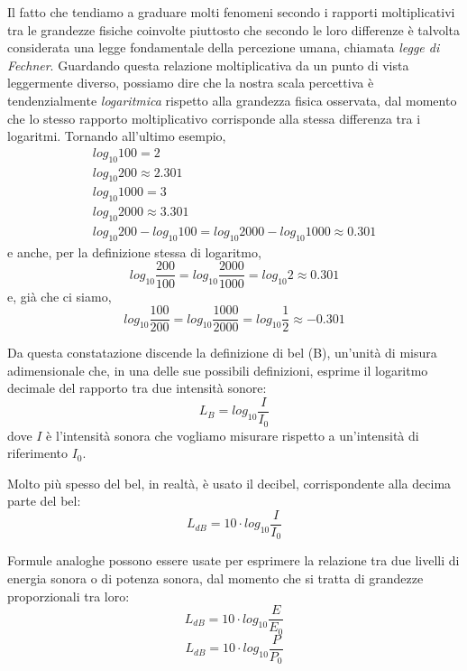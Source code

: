 Il fatto che tendiamo a graduare molti fenomeni secondo i rapporti moltiplicativi tra le grandezze fisiche coinvolte piuttosto che secondo le loro differenze è talvolta considerata una legge fondamentale della percezione umana, chiamata \emph{legge di Fechner}. Guardando questa relazione moltiplicativa da un punto di vista leggermente diverso, possiamo dire che la nostra scala percettiva è tendenzialmente \emph{logaritmica} rispetto alla grandezza fisica osservata, dal momento che lo stesso rapporto moltiplicativo corrisponde alla stessa differenza tra i logaritmi. Tornando all'ultimo esempio,
\begin{equation}
\begin{aligned}
log_{10}100 = 2\\
log_{10}200 \approx 2.301\\
log_{10}1000 = 3\\
log_{10}2000 \approx 3.301\\
log_{10}200 - log_{10}100 = log_{10}2000 - log_{10}1000 \approx 0.301
\end{aligned}
\end{equation}
e anche, per la definizione stessa di logaritmo,
\begin{equation}
log_{10}\frac{200}{100} = log_{10}\frac{2000}{1000} = log_{10}2 \approx 0.301 
\end{equation}
e, già che ci siamo,
\begin{equation}
log_{10}\frac{100}{200} = log_{10}\frac{1000}{2000} = log_{10}\frac{1}{2} \approx -0.301 
\end{equation}

Da questa constatazione discende la definizione di bel (\unit{B}), un'unità di misura adimensionale che, in una delle sue possibili definizioni, esprime il logaritmo decimale del rapporto tra due intensità sonore:
\begin{equation}
L_{B} = log_{10}\frac{I}{I_0}
\end{equation}
dove $I$ è l'intensità sonora che vogliamo misurare rispetto a un'intensità di riferimento $I_0$. 

Molto più spesso del bel, in realtà, è usato il decibel, corrispondente alla decima parte del bel:
\begin{equation}
L_{dB} = 10 \cdot log_{10}\frac{I}{I_0}
\end{equation}

Formule analoghe possono essere usate per esprimere la relazione tra due livelli di energia sonora o di potenza sonora, dal momento che si tratta di grandezze proporzionali tra loro:
\begin{equation}
L_{dB} = 10 \cdot log_{10}\frac{E}{E_0}
\end{equation}
\begin{equation}
L_{dB} = 10 \cdot log_{10}\frac{P}{P_0}
\end{equation}

